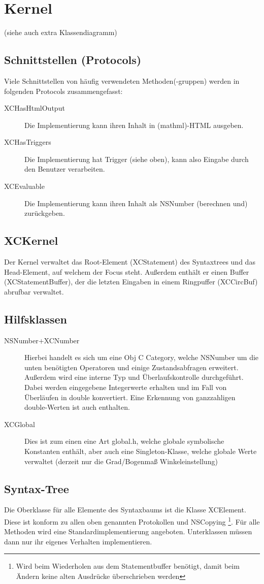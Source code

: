 \section{Kernel}
(siehe auch extra Klassendiagramm)
\subsection{Schnittstellen (Protocols)}
Viele Schnittstellen von häufig verwendeten Methoden(-gruppen) werden in folgenden Protocols zusammengefasst:
\begin{description}
	\item[XCHasHtmlOutput] Die Implementierung kann ihren Inhalt in (mathml)-HTML ausgeben. 
	\item[XCHasTriggers] Die Implementierung hat Trigger (siehe oben), kann also Eingabe durch den Benutzer verarbeiten.
	\item[XCEvaluable] Die Implementierung kann ihren Inhalt als NSNumber (berechnen und) zurückgeben.
\end{description}
\subsection{XCKernel}
Der Kernel verwaltet das Root-Element (XCStatement) des Syntaxtrees und das Head-Element, auf welchem der Focus steht. Außerdem enthält er einen Buffer (XCStatementBuffer), der die letzten Eingaben in einem Ringpuffer (XCCircBuf) abrufbar verwaltet.
\subsection{Hilfsklassen}
\begin{description}
	\item[NSNumber+XCNumber] Hierbei handelt es sich um eine Obj C Category, welche NSNumber um die unten benötigten Operatoren und einige Zustandsabfragen erweitert. 
		Außerdem wird eine interne Typ und Überlaufskontrolle durchgeführt. 
		Dabei werden eingegebene Integerwerte erhalten und im Fall von Überläufen in double konvertiert.
	Eine Erkennung von ganzzahligen double-Werten ist auch enthalten.
	\item[XCGlobal] Dies ist zum einen eine Art global.h, welche globale symbolische Konstanten enthält, aber auch eine Singleton-Klasse, welche globale Werte verwaltet (derzeit nur die Grad/Bogenmaß Winkeleinstellung)
\end{description}
\subsection{Syntax-Tree}
Die Oberklasse für alle Elemente des Syntaxbaums ist die Klasse XCElement.
Diese ist konform zu allen oben genannten Protokollen und NSCopying 
\footnote{Wird beim Wiederholen aus dem Statementbuffer benötigt, damit beim Ändern keine alten Ausdrücke überschrieben werden}. 
Für alle Methoden wird eine Standardimplementierung angeboten. 
Unterklassen müssen dann nur ihr eigenes Verhalten implementieren.


